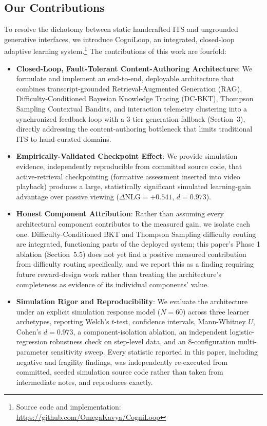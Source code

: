 \documentclass[notitlepage,12pt]{jedm}
\begin{document}
\subsection{Our Contributions}
To resolve the dichotomy between static handcrafted ITS and ungrounded generative interfaces, we introduce CogniLoop, an integrated, closed-loop adaptive learning system.\footnote{Source code and implementation: \url{https://github.com/OmegaKavya/CogniLoop}} The contributions of this work are fourfold:
\begin{itemize}
    \item \textbf{Closed-Loop, Fault-Tolerant Content-Authoring Architecture}: We formulate and implement an end-to-end, deployable architecture that combines transcript-grounded Retrieval-Augmented Generation (RAG), Difficulty-Conditioned Bayesian Knowledge Tracing (DC-BKT), Thompson Sampling Contextual Bandits, and interaction telemetry clustering into a synchronized feedback loop with a 3-tier generation fallback (Section~3), directly addressing the content-authoring bottleneck that limits traditional ITS to hand-curated domains.
    \item \textbf{Empirically-Validated Checkpoint Effect}: We provide simulation evidence, independently reproducible from committed source code, that active-retrieval checkpointing (formative assessment inserted into video playback) produces a large, statistically significant simulated learning-gain advantage over passive viewing ($\Delta\text{NLG}=+0.541$, $d=0.973$).
    \item \textbf{Honest Component Attribution}: Rather than assuming every architectural component contributes to the measured gain, we isolate each one. Difficulty-Conditioned BKT and Thompson Sampling difficulty routing are integrated, functioning parts of the deployed system; this paper's Phase 1 ablation (Section~5.5) does not yet find a positive measured contribution from difficulty routing specifically, and we report this as a finding requiring future reward-design work rather than treating the architecture's completeness as evidence of its individual components' value.
    \item \textbf{Simulation Rigor and Reproducibility}: We evaluate the architecture under an explicit simulation response model ($N=60$) across three learner archetypes, reporting Welch's $t$-test, confidence intervals, Mann-Whitney $U$, Cohen's $d=0.973$, a component-isolation ablation, an independent logistic-regression robustness check on step-level data, and an 8-configuration multi-parameter sensitivity sweep. Every statistic reported in this paper, including negative and fragility findings, was independently re-executed from committed, seeded simulation source code rather than taken from intermediate notes, and reproduces exactly.
\end{itemize}
\end{document}
